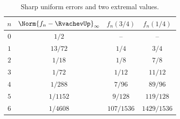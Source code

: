 \documentclass[11pt,oneside]{article}
\theoremstyle{definition}
\theoremstyle{remark}
\begin{document}
\begin{table}[htbp]
\centering
\caption{Sharp uniform errors and two extremal values.}
\label{repeated2:tab:exact-errors}
\begin{tabular}{c@{\qquad}c@{\qquad}c@{\qquad}c}
\toprule
$n$&$\Norm{f_n-\RvachevUp}_\infty$&$f_n(3/4)$&$f_n(1/4)$\\
\midrule
$0$&$1/2$&--&--\\
$1$&$13/72$&$1/4$&$3/4$\\
$2$&$1/18$&$1/8$&$7/8$\\
$3$&$1/72$&$1/12$&$11/12$\\
$4$&$1/288$&$7/96$&$89/96$\\
$5$&$1/1152$&$9/128$&$119/128$\\
$6$&$1/4608$&$107/1536$&$1429/1536$\\
\bottomrule
\end{tabular}
\end{table}
\end{document}
